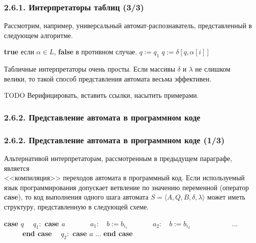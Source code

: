 \documentclass[mathserif,12pt,aspectratio=169]{beamer}
\def\Assign{\operatorname{:=}}
\def\TODO#1{{\color{gray} TODO {#1}}}
\begin{document}
\begin{frame}
\frametitle{2.6.1. Интерпретаторы таблиц (3/3)}

Рассмотрим, например, универсальный автомат-распознаватель,
представленный в следующем алгоритме.

\begin{algorithmic}
\ENSURE
{\textbf{true}} если $\alpha\in L$, {\textbf{false}} в противном
случае.
\STATE $q:= q_1$  
 \STATE $q:=\delta[q, \alpha[i]]$ 
 \ENDFOR
  
\end{algorithmic}


Табличные интерпретаторы очень просты. 
Если массивы $\delta$ и
$\lambda$ не слишком велики, то такой способ представления
автомата весьма эффективен.

\medskip
\TODO{Верифицировать, вставить ссылки, насытить примерами.}
\end{frame}


\subsubsection{2.6.2. Представление автомата в программном коде}\label{2.5.2.}
\begin{frame}
\frametitle{2.6.2. Представление автомата в программном коде (1/3)}

Альтернативой интерпретаторам, рассмотренным в предыдущем параграфе,
является \\ 
<<компиляция>> переходов автомата в программный код. Если
используемый язык программирования допускает ветвление по значению
переменной (оператор \textbf{case}), 
то код выполнения одного шага автомата 
$S= \langle A, Q, B, \delta,
\lambda\rangle$ может иметь структуру, 
представленную в следующей схеме.

\begin{algorithmic}
\STATE \textbf{case $q$}
 \STATE \textbf{$\quad q_1:$ case $a$}
    \STATE \textbf{$\quad\phantom{q_1:} \quad a_1: 
    \quad b\Assign b_{i_1}$}
    \STATE $\quad\phantom{q_1:} \quad a_2:
    \quad b:= b_{i_2}$
\STATE $\quad \phantom{q_1:}
    \quad \phantom{a_1:} \quad \dots$
\STATE\textbf{$\quad\phantom{q_1:}$ end case}
\STATE \textbf{$\quad q_2:$ case $a$}
 \STATE $\dots$
\STATE\textbf{end case} 
\end{algorithmic}

\end{frame}
\end{document}
